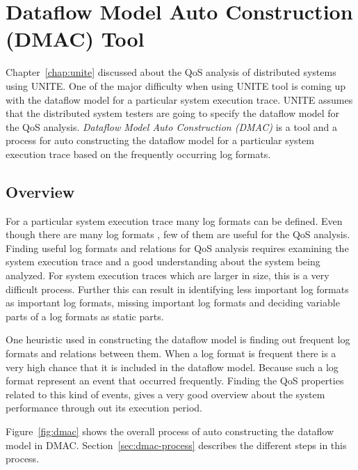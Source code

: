 
\chapter{Dataflow Model Auto Construction (DMAC) Tool}
\label{chap:dmac}

Chapter~\ref{chap:unite} discussed about the QoS analysis of 
distributed systems using UNITE. One of the major difficulty when 
using UNITE tool is coming up with the dataflow model for a 
particular system execution trace. UNITE assumes that the distributed 
system testers are going to specify the dataflow model for the QoS 
analysis. \textit{Dataflow Model Auto Construction (DMAC)} is a tool and 
a process for auto constructing the dataflow model for a particular 
system execution trace based on the frequently occurring log formats.

\section{Overview}
\label{sec:dmac-overview}

For a particular system execution trace many log formats can be defined. 
Even though there are many log formats , few of them are useful for the 
QoS analysis. Finding useful log formats and relations for QoS analysis 
requires examining the system execution trace and a good understanding 
about the system being analyzed. For system execution traces which are 
larger in size, this is a very difficult process.
Further this can result in identifying less important log formats as 
important log formats, missing important log formats and deciding variable 
parts of a log formats as static parts.

One heuristic used in constructing the dataflow model is finding out frequent 
log formats and relations between them. When a log format is frequent there 
is a very high chance that it is included in the dataflow model. Because 
such a log format represent an event that occurred frequently. Finding the 
QoS properties related to this kind of events, gives a very good overview 
about the system performance through out its execution period. 

Figure~\ref{fig:dmac} shows the overall process of auto constructing the 
dataflow model in DMAC. Section~\ref{sec:dmac-process} describes the different 
steps in this process.

